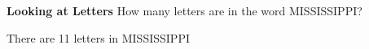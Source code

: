 \question \textbf{Looking at Letters}\newline
How many letters are in the word MISSISSIPPI?
\begin{solution}
There are 11 letters in MISSISSIPPI
\end{solution}